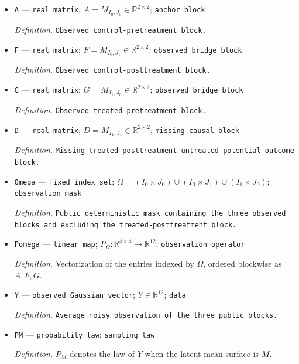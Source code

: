 \documentclass{article}
\begin{document}
\begin{itemize}
  \par\smallskip\noindent\emph{Definition.} \texttt{Untreated potential-\allowbreak{}outcome mean surface for the four row-\allowbreak{}period cells.}
  \item \texttt{A} --- \texttt{real matrix}; \(A=M_{I_0,J_0}\in\mathbb R^{2\times2}\); \texttt{anchor block}
  \par\smallskip\noindent\emph{Definition.} \texttt{Observed control-\allowbreak{}pretreatment block.}
  \item \texttt{F} --- \texttt{real matrix}; \(F=M_{I_0,J_1}\in\mathbb R^{2\times2}\); \texttt{observed bridge block}
  \par\smallskip\noindent\emph{Definition.} \texttt{Observed control-\allowbreak{}posttreatment block.}
  \item \texttt{G} --- \texttt{real matrix}; \(G=M_{I_1,J_0}\in\mathbb R^{2\times2}\); \texttt{observed bridge block}
  \par\smallskip\noindent\emph{Definition.} \texttt{Observed treated-\allowbreak{}pretreatment block.}
  \item \texttt{D} --- \texttt{real matrix}; \(D=M_{I_1,J_1}\in\mathbb R^{2\times2}\); \texttt{missing causal block}
  \par\smallskip\noindent\emph{Definition.} \texttt{Missing treated-\allowbreak{}posttreatment untreated potential-\allowbreak{}outcome block.}
  \item \texttt{Omega} --- \texttt{fixed index set}; \(\Omega=(I_0\times J_0)\cup(I_0\times J_1)\cup(I_1\times J_0)\); \texttt{observation mask}
  \par\smallskip\noindent\emph{Definition.} \texttt{Public deterministic mask containing the three observed blocks and excluding the treated-\allowbreak{}posttreatment block.}
  \item \texttt{Pomega} --- \texttt{linear map}; \(P_{\Omega}:\mathbb R^{4\times4}\to\mathbb R^{12}\); \texttt{observation operator}
  \par\smallskip\noindent\emph{Definition.} Vectorization of the entries indexed by \(\Omega\), ordered blockwise as \(A,F,G\).
  \item \texttt{Y} --- \texttt{observed Gaussian vector}; \(Y\in\mathbb R^{12}\); \texttt{data}
  \par\smallskip\noindent\emph{Definition.} \texttt{Average noisy observation of the three public blocks.}
  \item \texttt{PM} --- \texttt{probability law}; \texttt{sampling law}
  \par\smallskip\noindent\emph{Definition.} \(P_M\) denotes the law of \(Y\) when the latent mean surface is \(M\).

\end{itemize}
\end{document}
